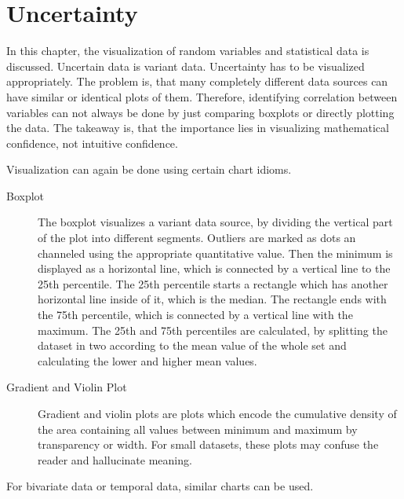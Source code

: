 \chapter{Uncertainty}
In this chapter, the visualization of random variables and statistical data is discussed.
Uncertain data is variant data.
Uncertainty has to be visualized appropriately.
The problem is, that many completely different data sources can have similar or identical plots of them.
Therefore, identifying correlation between variables can not always be done by just comparing boxplots or directly plotting the data.
The takeaway is, that the importance lies in visualizing mathematical confidence, not intuitive confidence.

Visualization can again be done using certain chart idioms.
\begin{description}
    \item[Boxplot] The boxplot visualizes a variant data source, by dividing the vertical part of the plot into different segments.
        Outliers are marked as dots an channeled using the appropriate quantitative value.
        Then the minimum is displayed as a horizontal line, which is connected by a vertical line to the 25th percentile.
        The 25th percentile starts a rectangle which has another horizontal line inside of it, which is the median.
        The rectangle ends with the 75th percentile, which is connected by a vertical line with the maximum.
        The 25th and 75th percentiles are calculated, by splitting the dataset in two according to the mean value of the whole set and calculating the lower and higher mean values.

    \item[Gradient and Violin Plot] Gradient and violin plots are plots which encode the cumulative density of the area containing all values between minimum and maximum by transparency or width.
        For small datasets, these plots may confuse the reader and hallucinate meaning.
\end{description}

For bivariate data or temporal data, similar charts can be used.
